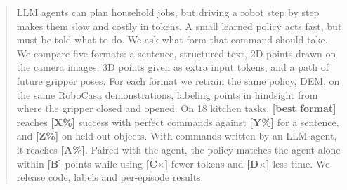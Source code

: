 \begin{abstract}
LLM agents can plan household jobs, but driving a robot step by step makes
them slow and costly in tokens. A small learned policy acts fast, but must be
told what to do. We ask what form that command should take. We compare five
formats: a sentence, structured text, 2D points drawn on the camera images,
3D points given as extra input tokens, and a path of future gripper poses.
For each format we retrain the same policy, DEM, on the same RoboCasa
demonstrations, labeling points in hindsight from where the gripper closed
and opened. On 18 kitchen tasks, \textbf{[best format]} reaches
\textbf{[X\%]} success with perfect commands against \textbf{[Y\%]} for a
sentence, and \textbf{[Z\%]} on held-out objects. With commands written by
an LLM agent, it reaches \textbf{[A\%]}. Paired with the agent, the policy
matches the agent alone within \textbf{[B]} points while using
\textbf{[C$\times$]} fewer tokens and \textbf{[D$\times$]} less time. We
release code, labels and per-episode results.
\end{abstract}
